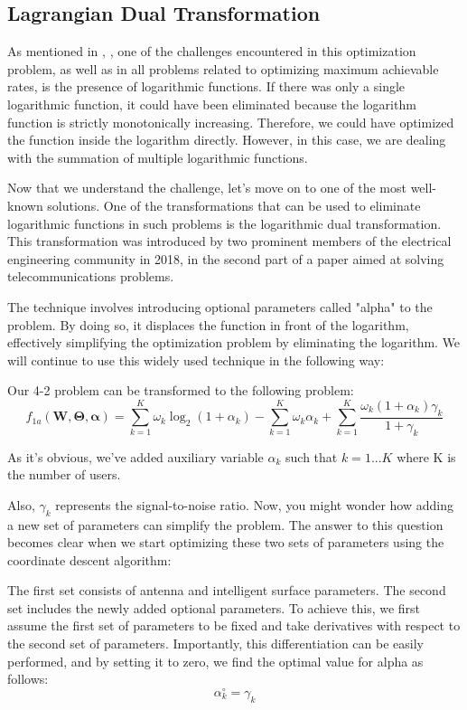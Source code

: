 \documentclass{article}
\begin{document}
\subsection{Lagrangian Dual Transformation}
As mentioned in \cite{13}, \cite{14}, one of the challenges encountered in this optimization problem, as well as in all problems related to optimizing maximum achievable rates, is the presence of logarithmic functions. If there was only a single logarithmic function, it could have been eliminated because the logarithm function is strictly monotonically increasing. Therefore, we could have optimized the function inside the logarithm directly. However, in this case, we are dealing with the summation of multiple logarithmic functions.


Now that we understand the challenge, let's move on to one of the most well-known solutions. One of the transformations that can be used to eliminate logarithmic functions in such problems is the logarithmic dual transformation. This transformation was introduced by two prominent members of the electrical engineering community in 2018, in the second part of a paper aimed at solving telecommunications problems.

The technique involves introducing optional parameters called "alpha" to the problem. By doing so, it displaces the function in front of the logarithm, effectively simplifying the optimization problem by eliminating the logarithm. We will continue to use this widely used technique in the following way:

Our 4-2 problem can be transformed to the following problem:
\[
f_{1a}(\mathbf{W}, \boldsymbol{\Theta}, \boldsymbol{\alpha}) = \sum_{k=1}^{K} \omega_k \log_2(1 + \alpha_k) - \sum_{k=1}^{K} \omega_k \alpha_k + \sum_{k=1}^{K} \frac{\omega_k (1 + \alpha_k) \gamma_k}{1 + \gamma_k}
\]

As it's obvious, we've added auxiliary variable $\alpha_k$ such that $k = 1 ... K$ where K is the number of users.

Also, $\gamma_k$ represents the signal-to-noise ratio. Now, you might wonder how adding a new set of parameters can simplify the problem. The answer to this question becomes clear when we start optimizing these two sets of parameters using the coordinate descent algorithm:

The first set consists of antenna and intelligent surface parameters.
The second set includes the newly added optional parameters.
To achieve this, we first assume the first set of parameters to be fixed and take derivatives with respect to the second set of parameters. Importantly, this differentiation can be easily performed, and by setting it to zero, we find the optimal value for alpha as follows:
\[\alpha_k^\circ = \gamma_k\]
\end{document}

